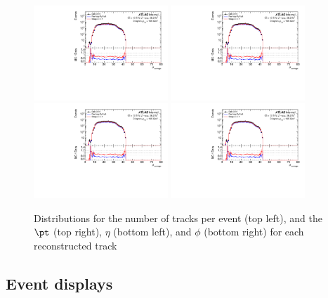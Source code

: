 \begin{figure}[h!]
  \centering
  \includegraphics[page=128,width=0.45\textwidth]{figures/ZjetOmnifoldMCDataComp.pdf}
  \includegraphics[page=144,width=0.45\textwidth]{figures/ZjetOmnifoldMCDataComp.pdf} \\
  \includegraphics[page=148,width=0.45\textwidth]{figures/ZjetOmnifoldMCDataComp.pdf}
  \includegraphics[page=152,width=0.45\textwidth]{figures/ZjetOmnifoldMCDataComp.pdf}
  \caption{Distributions for the number of tracks per event (top left), and the $\pt$ (top right), $\eta$ (bottom left), and $\phi$ (bottom right) for each reconstructed track}
  \label{fig:trackInfo}
\end{figure}

\clearpage
\subsection{Event displays}
\label{sec:event-displays}

